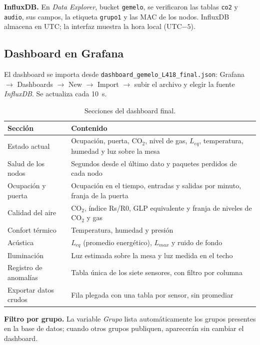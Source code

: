 \documentclass[11pt,a4paper]{article}
\newcommand{\arch}[1]{\texttt{#1}}
\begin{document}
\textbf{InfluxDB.} En \emph{Data Explorer}, bucket \texttt{gemelo}, se verificaron las
tablas \texttt{co2} y \texttt{audio}, sus campos, la etiqueta \texttt{grupo1} y las MAC de
los nodos. InfluxDB almacena en UTC; la interfaz muestra la hora local (UTC$-5$).

\subsection{Dashboard en Grafana}

El dashboard se importa desde \arch{dashboard\_gemelo\_L418\_final.json}: Grafana $\rightarrow$
Dashboards $\rightarrow$ New $\rightarrow$ Import $\rightarrow$ subir el archivo y elegir la
fuente \emph{InfluxDB}. Se actualiza cada 10~s.

\begin{table}[H]
\centering
\caption{Secciones del dashboard final.}
\begin{tabularx}{\textwidth}{@{}lX@{}}
\toprule
\textbf{Secci\'on} & \textbf{Contenido} \\
\midrule
Estado actual & Ocupaci\'on, puerta, CO$_2$, nivel de gas, $L_{eq}$, temperatura, humedad y luz sobre la mesa \\
Salud de los nodos & Segundos desde el \'ultimo dato y paquetes perdidos de cada nodo \\
Ocupaci\'on y puerta & Ocupaci\'on en el tiempo, entradas y salidas por minuto, franja de la puerta \\
Calidad del aire & CO$_2$, \'indice Rs/R0, GLP equivalente y franja de niveles de CO$_2$ y gas \\
Confort t\'ermico & Temperatura, humedad y presi\'on \\
Ac\'ustica & $L_{eq}$ (promedio energ\'etico), $L_{max}$ y ruido de fondo \\
Iluminaci\'on & Luz estimada sobre la mesa y luz medida en el techo \\
Registro de anomal\'ias & Tabla \'unica de los siete sensores, con filtro por columna \\
Exportar datos crudos & Fila plegada con una tabla por sensor, sin promediar \\
\bottomrule
\end{tabularx}
\end{table}

\textbf{Filtro por grupo.} La variable \emph{Grupo} lista autom\'aticamente los grupos
presentes en la base de datos; cuando otros grupos publiquen, aparecer\'an sin cambiar el
dashboard.
\end{document}
